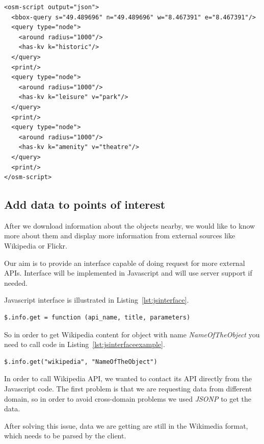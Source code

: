 \documentclass[journal]{IEEEtran}
\begin{document}
\begin{lstlisting}[caption={Enhanced~Overpass~query~in~XML~format},label={lst:xmlquery2}]
<osm-script output="json">
  <bbox-query s="49.489696" n="49.489696" w="8.467391" e="8.467391"/>
  <query type="node">
    <around radius="1000"/>
    <has-kv k="historic"/>
  </query>
  <print/>
  <query type="node">
    <around radius="1000"/>
    <has-kv k="leisure" v="park"/>
  </query>
  <print/>
  <query type="node">
    <around radius="1000"/>
    <has-kv k="amenity" v="theatre"/>
  </query>
  <print/>
</osm-script>
\end{lstlisting}


\subsection{Add data to points of interest}

After we download information about the objects nearby, we would like to know more about them and display more information from external sources like Wikipedia or Flickr.

Our aim is to provide an interface capable of doing request for more external APIs. Interface will be implemented in Javascript and will use server support if needed.

Javascript interface is illustrated in Listing~\ref{lst:jsinterface}.

\begin{lstlisting}[caption={Javascript~interface~for~connecting~external~API},label={lst:jsinterface}]
$.info.get = function (api_name, title,	parameters)
\end{lstlisting}

So in order to get Wikipedia content for object with name \textit{NameOfTheObject} you need to call code in Listing~\ref{lst:jsinterfaceexample}.

\begin{lstlisting}[caption={Getting Wikipedia content},label={lst:jsinterfaceexample}]
$.info.get("wikipedia", "NameOfTheObject")
\end{lstlisting}

In order to call Wikipedia API, we wanted to contact its API directly from the Javascript code. The first problem is that we are requesting data from different domain, so in order to avoid cross-domain problems we used \textit{JSONP} to get the data.

After solving this issue, data we are getting are still in the Wikimedia format, which needs to be parsed by the client.
\end{document}
